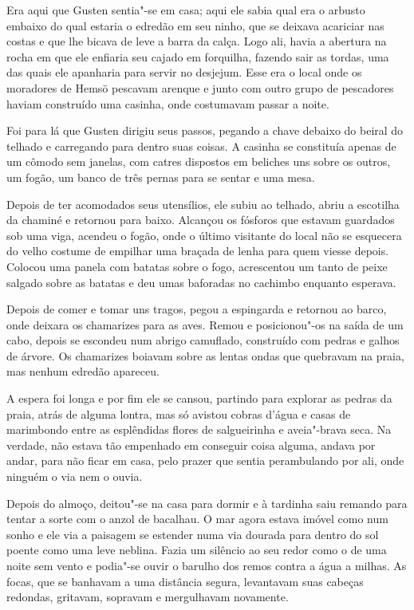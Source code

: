  Era aqui que Gusten sentia"-se em casa; aqui ele sabia qual era o arbusto embaixo do qual 
 estaria o edredão em seu ninho, que se deixava acariciar nas costas e que lhe bicava de leve a barra da
calça. Logo ali, havia a abertura na rocha em que ele enfiaria seu cajado em
 forquilha, fazendo sair as tordas, uma das quais ele apanharia para servir no
 desjejum. Esse era o local onde os moradores de Hemsö pescavam arenque e junto
 com outro grupo de pescadores haviam construído uma casinha, onde costumavam
 passar a noite. 
 
 Foi para lá que Gusten dirigiu seus passos, pegando a chave
 debaixo do beiral do telhado e carregando para dentro suas coisas. A casinha se
 constituía apenas de um cômodo sem janelas, com catres dispostos em beliches
 uns sobre os outros, um fogão, um banco de três pernas para se sentar e uma
 mesa. 
 
 Depois de ter acomodados seus utensílios, ele subiu ao telhado, abriu a
 escotilha da chaminé e retornou para baixo. Alcançou os fósforos que
 estavam guardados sob uma viga, acendeu o fogão, onde o último visitante
 do local não se esquecera do velho costume de empilhar uma braçada de lenha para
 quem viesse depois. Colocou uma panela com batatas sobre o fogo, acrescentou
 um tanto de peixe salgado sobre as batatas e deu umas baforadas no cachimbo
 enquanto esperava. 
 
 Depois de comer e tomar uns tragos, pegou a espingarda e
 retornou ao barco, onde deixara os chamarizes para as aves. Remou e 
posicionou"-os na saída de um cabo, depois se escondeu num abrigo
 camuflado, construído com pedras e galhos de árvore. Os chamarizes boiavam sobre
 as lentas ondas que quebravam na praia, mas nenhum edredão apareceu. 
 
 A espera foi longa e por fim ele se cansou, partindo para explorar as pedras da
 praia, atrás de alguma lontra, mas só avistou cobras d’água e casas de
 marimbondo entre as esplêndidas flores de salgueirinha e aveia"-brava seca. Na
 verdade, não estava tão empenhado em conseguir coisa alguma, andava por
 andar, para não ficar em casa, pelo prazer que sentia perambulando por ali,
 onde ninguém o via nem o ouvia. 
 
 Depois do almoço, deitou"-se na casa
 para dormir e à tardinha saiu remando para tentar a sorte com o anzol de
 bacalhau. O mar agora estava imóvel como num sonho e ele via a paisagem se
 estender numa via dourada para dentro do sol poente como uma leve neblina. Fazia
 um silêncio ao seu redor como o de uma noite sem vento e podia"-se ouvir o barulho dos
 remos contra a água a milhas. As focas, que se banhavam a uma distância
 segura, levantavam suas cabeças redondas, gritavam, sopravam e mergulhavam
 novamente. 
 
